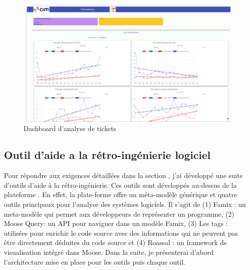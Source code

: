 \documentclass[a4paper]{article}
\begin{document}
\begin{figure}[htbp]
  \begin{center}
  \includegraphics[width=\textwidth]{./figures/dashboard.png}
  \caption{Dashboard d'analyse de tickets}
  \label{fig:dashboardFig}
\end{center}
\vspace{-0.3cm}
\end{figure}


\subsection{Outil d'aide a la rétro-ingénierie logiciel}
Pour répondre aux exigences détaillées dans la section , j'ai développé une suite d'outils d'aide à la rétro-ingénierie.
Ces outils sont développés au-dessus de la plateforme \cite{Nier05c}.
En effet, la plate-forme offre un méta-modèle générique et quatre outils principaux pour l'analyse des systèmes logiciels.
Il s'agit de (1) Famix : un meta-modèle qui permet aux développeurs de représenter un programme, (2) Moose Query: un API pour naviguer dans un modèle Famix,
(3) Les tags : utilisées pour enrichir le code source avec des informations qui ne peuvent pas être directement déduites du code source et 
(4) Roassal : un framework de visualisation intégré dans Moose.
Dans la suite, je présenterai d'abord l'architecture mise en place pour les outils puis chaque outil.
\end{document}
